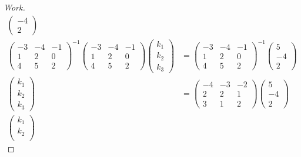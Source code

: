 \documentclass{article}
\begin{document}
\begin{proof}[Work]
\begin{align*}
\begin{pmatrix}
            -4 \\
            2
        \end{pmatrix}    \\
        \begin{pmatrix}
            -3 & -4 & -1 \\
            1  & 2  & 0  \\
            4  & 5  & 2
        \end{pmatrix}^{-1}
        \begin{pmatrix}
            -3 & -4 & -1 \\
            1  & 2  & 0  \\
            4  & 5  & 2
        \end{pmatrix}
        \begin{pmatrix}
            k_1 \\
            k_2 \\
            k_3
        \end{pmatrix} & =
        \begin{pmatrix}
            -3 & -4 & -1 \\
            1  & 2  & 0  \\
            4  & 5  & 2
        \end{pmatrix}^{-1}
        \begin{pmatrix}
            5  \\
            -4 \\
            2
        \end{pmatrix}    \\
        \begin{pmatrix}
            k_1 \\
            k_2 \\
            k_3
        \end{pmatrix} & =
        \begin{pmatrix}
            -4 & -3 & -2 \\
            2  & 2  & 1  \\
            3  & 1  & 2
        \end{pmatrix}
        \begin{pmatrix}
            5  \\
            -4 \\
            2
        \end{pmatrix}    \\
        \begin{pmatrix}
            k_1 \\
            k_2 \\

\end{pmatrix}
\end{align*}
\end{proof}
\end{document}
